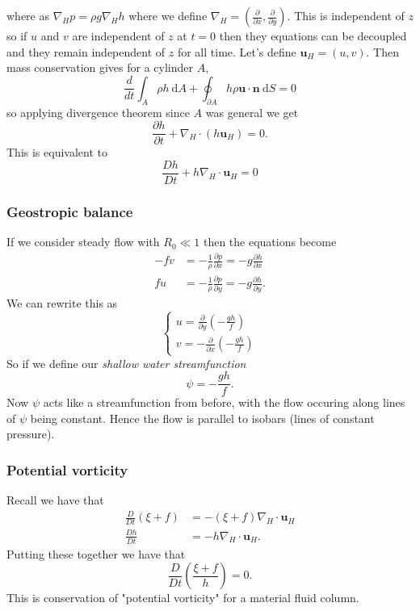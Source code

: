 \documentclass{article}
\begin{document}
where as $ \nabla_H p = \rho g \nabla_H h $ where we define $ \nabla_H = \left(\frac{\partial}{\partial x}, \frac{\partial}{\partial y}\right) $. This is independent of $ z $ so if $ u $ and $ v $ are independent of $ z $ at $ t=0 $ then they equations can be decoupled and they remain independent of $ z $ for all time. Let's define $ \mathbf u_H = (u,v) $. Then mass conservation gives for a cylinder $ A $,
\[
	\frac d{dt}\int_A \rho h \ \mathrm dA +\oint_{\partial A} h \rho\mathbf u \cdot \mathbf n  \ \mathrm dS = 0
\]
so applying divergence theorem since $ A $ was general we get
\[
	\frac{\partial h}{\partial t} + \nabla_H \cdot (h\mathbf u_{H}) = 0.
\]
This is equivalent to
\[
	\frac{Dh}{Dt} + h \nabla_H \cdot \mathbf u_H = 0
\]
\subsubsection{Geostropic balance}
If we consider steady flow with $ R_0 \ll 1 $ then the equations become
\begin{align*}
	-fv &= -\frac 1\rho \frac{\partial p}{\partial x} = - g\frac{\partial h}{\partial x} \\
	fu &= -\frac 1\rho \frac{\partial p}{\partial y} = - g\frac{\partial h}{\partial y}.
\end{align*}
We can rewrite this as
\[
  \begin{cases}
	  u = \frac{\partial}{\partial y}\left(-\frac{gh}f\right) \\
	  v = -\frac{\partial}{\partial x} \left( -\frac{gh}f\right)
  \end{cases}
\]
So if we define our \textit{shallow water streamfunction}
\[
	\psi = - \frac{gh}f.
\]
Now $ \psi $ acts like a streamfunction from before, with the flow occuring along lines of $ \psi $ being constant. Hence the flow is parallel to isobars (lines of constant pressure). 
\subsubsection{Potential vorticity}
Recall we have that
\begin{align*}
	\frac D{Dt}(\xi + f) &= -(\xi + f)\nabla_H \cdot\mathbf u_H \\
	\frac{Dh}{Dt} &= -h \nabla_H\cdot\mathbf u_H.
\end{align*}
Putting these together we have that
\[
	\frac D{Dt} \left(\frac{\xi + f}h \right) = 0.
\]
This is conservation of "potential vorticity" for a material fluid column.
\end{document}
